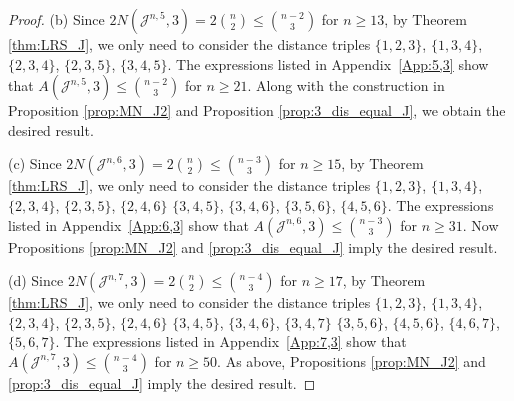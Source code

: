 \documentclass{amsart}
\newcommand{\cJ}{\mathcal{J}}
\begin{document}
\begin{proof}
(b) Since $2N(\cJ^{n, 5}, 3) = 2\binom{n}{2} \leq \binom{n-2}{3}$ for $n \geq 13$, by Theorem \ref{thm:LRS_J}, we only need to consider the distance triples $\{1, 2, 3\}$, $\{1, 3, 4\}$, $\{2, 3, 4\}$, $\{2, 3, 5\}$, $\{3, 4, 5\}$. The expressions listed in Appendix~\ref{App:5,3}
show that $A(\cJ^{n, 5}, 3)\le \binom{n-2}{3}$ for $n\ge 21$. Along with the construction in Proposition \ref{prop:MN_J2} and Proposition \ref{prop:3_dis_equal_J}, we obtain the desired result.

(c) Since $2N(\cJ^{n, 6}, 3) = 2\binom{n}{2} \leq \binom{n-3}{3}$ for $n \geq 15$, by Theorem \ref{thm:LRS_J}, we only need to consider the distance triples $\{1, 2, 3\}$, $\{1, 3, 4\}$, $\{2, 3, 4\}$, $\{2, 3, 5\}$, $\{2, 4, 6\}$ $\{3, 4, 5\}$, $\{3, 4, 6\}$, $\{3, 5, 6\}$, $\{4, 5, 6\}$. The expressions listed in Appendix~\ref{App:6,3}
show that $A(\cJ^{n, 6}, 3)\le \binom{n-3}{3}$ for $n\ge 31$. Now Propositions \ref{prop:MN_J2} and  \ref{prop:3_dis_equal_J} imply the desired result.

(d) Since $2N(\cJ^{n, 7}, 3) = 2\binom{n}{2} \leq \binom{n-4}{3}$ for $n \geq 17$, by Theorem \ref{thm:LRS_J}, we only need to consider the distance triples $\{1, 2, 3\}$, $\{1, 3, 4\}$, $\{2, 3, 4\}$, $\{2, 3, 5\}$, $\{2, 4, 6\}$ $\{3, 4, 5\}$, $\{3, 4, 6\}$, $\{3, 4, 7\}$ $\{3, 5, 6\}$, $\{4, 5, 6\}$, $\{4, 6, 7\}$, $\{5, 6, 7\}$. The expressions listed in Appendix~\ref{App:7,3}
show that $A(\cJ^{n, 7}, 3)\le \binom{n-4}{3}$ for $n\ge 50$. As above, Propositions \ref{prop:MN_J2} and  \ref{prop:3_dis_equal_J} imply the desired result.
\end{proof}
\end{document}
